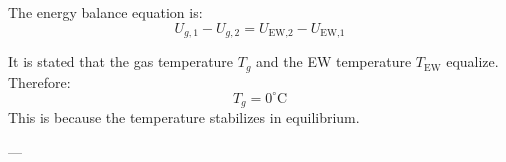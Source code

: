 The energy balance equation is:  
\[
U_{g,1} - U_{g,2} = U_{\text{EW,2}} - U_{\text{EW,1}}
\]  

It is stated that the gas temperature \( T_g \) and the EW temperature \( T_{\text{EW}} \) equalize. Therefore:  
\[
T_g = 0^\circ\text{C}
\]  
This is because the temperature stabilizes in equilibrium.

---
